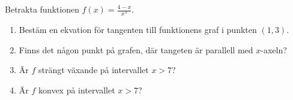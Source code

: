 


Betrakta funktionen $f(x) = \frac{4-x}{x^3} $.
\begin{enumerate}
\item Bestäm en ekvation för tangenten till funktionens graf i punkten $(1,3)$.
\item Finns det någon punkt på grafen, där tangeten är parallell med $x$-axeln?
\item Är $f$ strängt växande på intervallet $ x > 7$?
\item Är $f$ konvex på intervallet $x>7$?
\end{enumerate}

